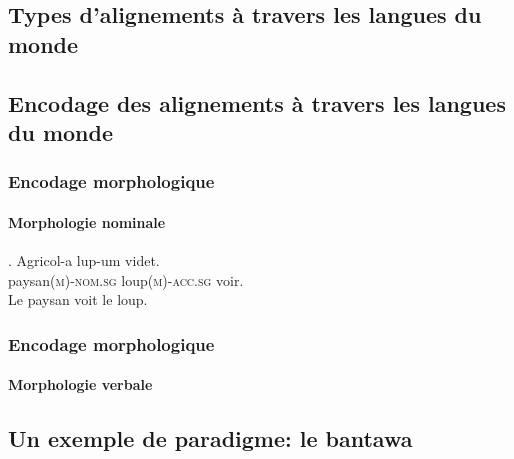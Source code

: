 \subsection[Alignements]{Types d'alignements à travers les langues du monde}



\subsection[Encodage des alignements]{Encodage des alignements à travers les langues du monde}

\begin{frame}
\frametitle{Encodage morphologique}
\framesubtitle{Morphologie nominale}

\ex. Agricol-a lup-um videt.\\
paysan\textsc{(m)-nom.sg} loup\textsc{(m)-acc.sg} voir.\textsc{}\\
Le paysan voit le loup.

\end{frame}

\begin{frame}
\frametitle{Encodage morphologique}
\framesubtitle{Morphologie verbale}

\end{frame}

\subsection[Bantawa]{Un exemple de paradigme: le bantawa}

